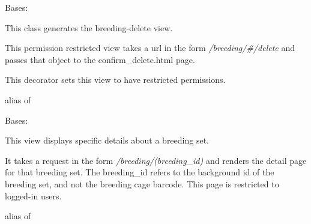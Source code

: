 \documentclass[letterpaper,10pt,english]{sphinxmanual}
\begin{document}
\begin{fulllineitems}
\label{api:mousedb.animal.views.BreedingDelete}
Bases: \href{http://docs.djangoproject.com/en/dev/ref/class-based-views/\#django.views.generic.edit.DeleteView}{}

This class generates the breeding-delete view.

This permission restricted view takes a url in the form \emph{/breeding/\#/delete} and passes that object to the confirm\_delete.html page.


\begin{fulllineitems}
\label{api:mousedb.animal.views.BreedingDelete.dispatch}
This decorator sets this view to have restricted permissions.

\end{fulllineitems}



\begin{fulllineitems}
\label{api:mousedb.animal.views.BreedingDelete.model}
alias of 

\end{fulllineitems}


\end{fulllineitems}



\begin{fulllineitems}
\label{api:mousedb.animal.views.BreedingDetail}
Bases: {\hyperref[api:mousedb.views.ProtectedDetailView]{}}

This view displays specific details about a breeding set.

It takes a request in the form \emph{/breeding/(breeding\_id)} and renders the detail page for that breeding set.
The breeding\_id refers to the background id of the breeding set, and not the breeding cage barcode.
This page is restricted to logged-in users.


\begin{fulllineitems}
\label{api:mousedb.animal.views.BreedingDetail.model}
alias of 

\end{fulllineitems}


\end{fulllineitems}
\end{document}
